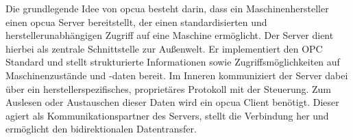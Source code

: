 Die grundlegende Idee von \acs{opcua} besteht darin, dass ein Maschinenhersteller einen \acs{opcua} Server bereitstellt, der einen standardisierten und herstellerunabhängigen Zugriff auf eine Maschine ermöglicht.
Der Server dient hierbei als zentrale Schnittstelle zur Außenwelt. Er implementiert den OPC Standard und stellt strukturierte Informationen sowie Zugriffsmöglichkeiten auf Maschinenzustände und -daten bereit.
Im Inneren kommuniziert der Server dabei über ein herstellerspezifisches, proprietäres Protokoll mit der Steuerung.
Zum Auslesen oder Austauschen dieser Daten wird ein \acs{opcua} Client benötigt. Dieser agiert als Kommunikationspartner des Servers, stellt die Verbindung her und ermöglicht den bidirektionalen Datentransfer. \cite{OPCUA}